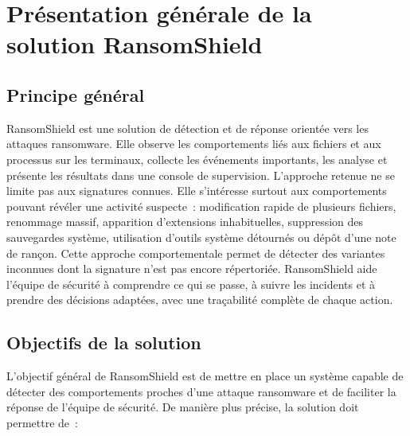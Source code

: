\section{Présentation générale de la solution RansomShield}

\subsection{Principe général}

RansomShield est une solution de détection et de réponse orientée vers les attaques ransomware. Elle observe les comportements liés aux fichiers et aux processus sur les terminaux, collecte les événements importants, les analyse et présente les résultats dans une console de supervision. L'approche retenue ne se limite pas aux signatures connues. Elle s'intéresse surtout aux comportements pouvant révéler une activité suspecte~: modification rapide de plusieurs fichiers, renommage massif, apparition d'extensions inhabituelles, suppression des sauvegardes système, utilisation d'outils système détournés ou dépôt d'une note de rançon. Cette approche comportementale permet de détecter des variantes inconnues dont la signature n'est pas encore répertoriée. RansomShield aide l'équipe de sécurité à comprendre ce qui se passe, à suivre les incidents et à prendre des décisions adaptées, avec une traçabilité complète de chaque action.

\subsection{Objectifs de la solution}

L'objectif général de RansomShield est de mettre en place un système capable de détecter des comportements proches d'une attaque ransomware et de faciliter la réponse de l'équipe de sécurité. De manière plus précise, la solution doit permettre de~:


